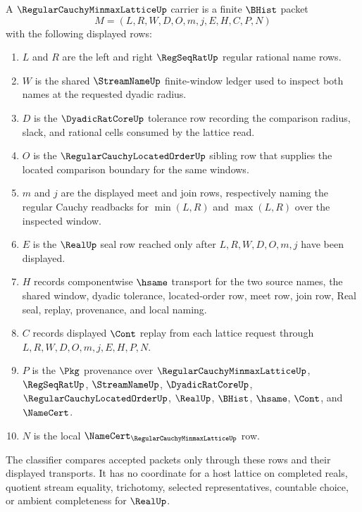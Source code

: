 \begin{definition}
\label{def:regular-cauchy-minmax-lattice-carrier}
A $\RegularCauchyMinmaxLatticeUp$ carrier is a finite $\BHist$ packet
$$
M=(L,R,W,D,O,m,j,E,H,C,P,N)
$$
with the following displayed rows:
\begin{enumerate}
\item $L$ and $R$ are the left and right $\RegSeqRatUp$ regular rational name rows.
\item $W$ is the shared $\StreamNameUp$ finite-window ledger used to inspect both names at the requested dyadic radius.
\item $D$ is the $\DyadicRatCoreUp$ tolerance row recording the comparison radius, slack, and rational cells consumed by the lattice read.
\item $O$ is the $\RegularCauchyLocatedOrderUp$ sibling row that supplies the located comparison boundary for the same windows.
\item $m$ and $j$ are the displayed meet and join rows, respectively naming the regular Cauchy readbacks for $\min(L,R)$ and $\max(L,R)$ over the inspected window.
\item $E$ is the $\RealUp$ seal row reached only after $L,R,W,D,O,m,j$ have been displayed.
\item $H$ records componentwise $\hsame$ transport for the two source names, the shared window, dyadic tolerance, located-order row, meet row, join row, Real seal, replay, provenance, and local naming.
\item $C$ records displayed $\Cont$ replay from each lattice request through $L,R,W,D,O,m,j,E,H,P,N$.
\item $P$ is the $\Pkg$ provenance over $\RegularCauchyMinmaxLatticeUp$, $\RegSeqRatUp$, $\StreamNameUp$, $\DyadicRatCoreUp$, $\RegularCauchyLocatedOrderUp$, $\RealUp$, $\BHist$, $\hsame$, $\Cont$, and $\NameCert$.
\item $N$ is the local $\NameCert_{\RegularCauchyMinmaxLatticeUp}$ row.
\end{enumerate}
The classifier compares accepted packets only through these rows and their displayed transports. It has no coordinate for a host lattice on completed reals, quotient stream equality, trichotomy, selected representatives, countable choice, or ambient completeness for $\RealUp$.
\end{definition}

